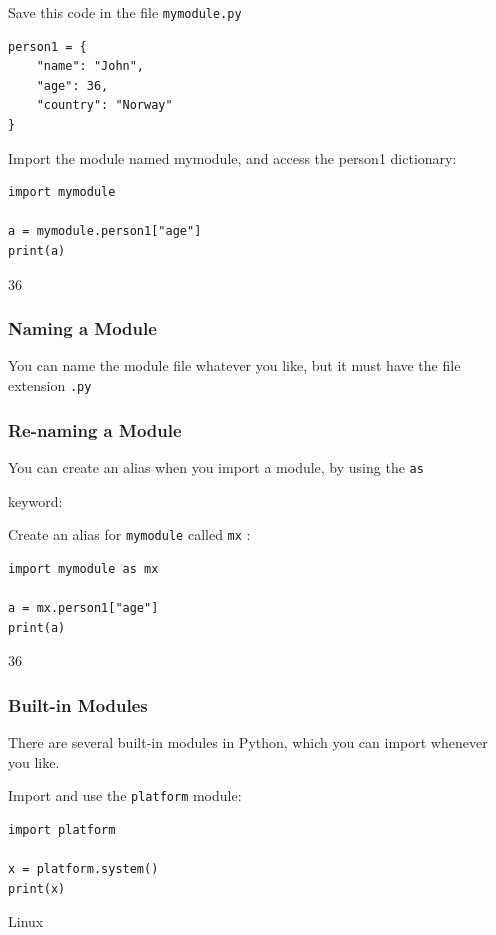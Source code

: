 \documentclass[12pt,a4paper]{article}
\newcommand{\code}[1]{%
	\colorbox{backcolour}{\lstinline{#1}}%
}
\newcommand{\lcode}[1]{%
	\lstinline{#1}%
}
\begin{document}
\begin{ebox}
Save this code in the file \lcode{mymodule.py}
	\begin{lstlisting}
person1 = {
    "name": "John",
    "age": 36,
    "country": "Norway"
}
	\end{lstlisting}
\end{ebox}

\begin{ebox}
Import the module named mymodule, and access the person1 dictionary:
	\begin{lstlisting}
import mymodule

a = mymodule.person1["age"]
print(a)
	\end{lstlisting}
\tcblower
	\begin{vercode}
36
	\end{vercode}
\end{ebox}
\subsubsection{Naming a Module}

You can name the module file whatever you like, but it must have the file
extension \code{.py}
\subsubsection{Re-naming a Module}

You can create an alias when you import a module, by using the \code{as}
keyword:

\begin{ebox}
Create an alias for \lcode{mymodule} called \lcode{mx}:
	\begin{lstlisting}
import mymodule as mx

a = mx.person1["age"]
print(a)
	\end{lstlisting}
\tcblower
	\begin{vercode}
36
	\end{vercode}
\end{ebox}
\subsubsection{Built-in Modules}

There are several built-in modules in Python, which you can import
whenever you like.

\begin{ebox}
Import and use the \lcode{platform} module:
	\begin{lstlisting}
import platform

x = platform.system()
print(x)
	\end{lstlisting}
\tcblower
	\begin{vercode}
Linux
	\end{vercode}
\end{ebox}
\end{document}
